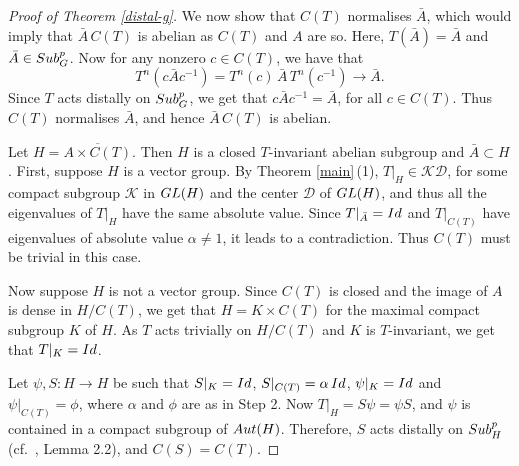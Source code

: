 \documentclass{amsart}
\numberwithin{equation}{section}
\newcommand{\Aut}{{\rm Aut}}
\newcommand{\K}{{\mathcal K}}
\newcommand{\D}{{\mathcal D}}
\newcommand{\spg}{{\rm Sub}^p_G}
\newcommand{\spp}{{\rm Sub}^{p}}
\newcommand{\Id}{{\rm Id}}
\newcommand{\GL}{{\rm GL}}
\let\ol=\overline
\let\ap=\alpha
\theoremstyle{remark}
\begin{document}
\begin{proof}[Proof of Theorem {\rm\ref{distal-g}}]
We now show that $C(T)$ normalises $\bar A$, which would imply that $\bar A\, C(T)$ is 
abelian as $C(T)$ and $A$ are so. Here, $T(\bar A)=\bar A$ and $\bar A\in \spg$. Now for any nonzero $c\in C(T)$, 
we have that 
 $$
 T^n(c\bar A c^{-1})=T^n(c)\,\bar A\,T^n(c^{-1})\to\bar A.$$
 Since $T$ acts distally on $\spg$, we get that $c\bar Ac^{-1}=\bar A$, for all $c\in C(T)$. 
 Thus $C(T)$ normalises $\bar A$, and hence $\bar A\, C(T)$ is abelian. 
 
 Let $H=\ol{A\times C(T)}$. Then $H$ is a closed $T$-invariant abelian subgroup and $\bar A\subset H$. First, suppose $H$ 
 is a vector group. By Theorem \ref{main}\,(1),  $T|_H\in \K\D$, for some compact subgroup $\K$ in $\GL(H)$ and 
 the center $\D$ of $\GL(H)$, and thus all the eigenvalues of $T|_H$ have the same absolute value. Since $T|_{\bar A}=\Id$ 
 and $T|_{C(T)}$ have eigenvalues of absolute value $\ap\ne 1$, it leads to a contradiction. Thus $C(T)$ must be trivial in
 this case. 
 
 \smallskip
   Now suppose $H$ is not a vector group. Since $C(T)$ is closed and the image of $A$ 
 is dense in $H/C(T)$, we get that $H=K\times C(T)$ for the maximal compact subgroup $K$ of $H$. 
 As $T$ acts trivially on $H/C(T)$ and $K$ is $T$-invariant, we get that $T|_K=\Id$. 
 
 Let $\psi, S: H\to H$ be such that $S|_K=\Id$, $S|_{C(T)}=\ap\,\Id$, $\psi|_K=\Id$ and 
$\psi|_{C(T)}=\phi$, where $\alpha$ and $\phi$ are as in Step 2. Now $T|_{H}=S\psi=\psi S$, and $\psi$ is 
contained in a compact subgroup of $\Aut(H)$. Therefore, $S$ acts distally on $\spp_{H}$ (cf.\ \cite{SY2}, Lemma 2.2), 
and $C(S)=C(T)$. 


\end{proof}
\end{document}

